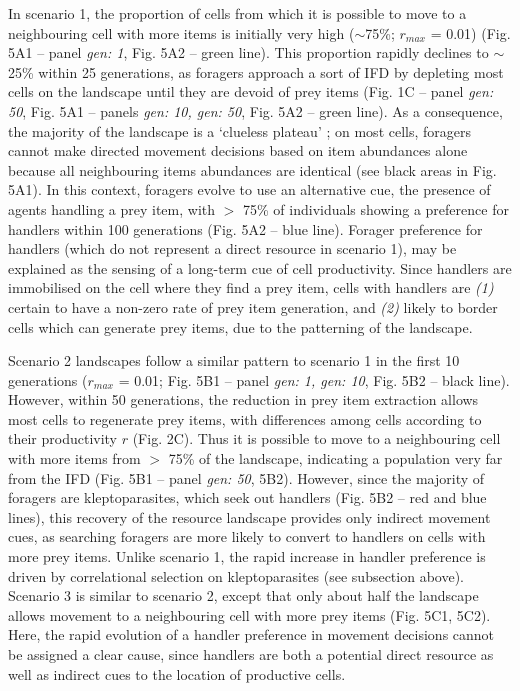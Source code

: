 \documentclass[11pt]{article}
\begin{document}
In scenario 1, the proportion of cells from which it is possible to move to a neighbouring cell with more items is initially very high ($\sim$75\%; $r_{max}$ = 0.01) (Fig. 5A1 -- panel \textit{gen: 1}, Fig. 5A2 -- green line).
This proportion rapidly declines to $\sim$25\% within 25 generations, as foragers approach a sort of IFD by depleting most cells on the landscape until they are devoid of prey items (Fig. 1C -- panel \textit{gen: 50}, Fig. 5A1 -- panels \textit{gen: 10, gen: 50}, Fig. 5A2 -- green line).
As a consequence, the majority of the landscape is a `clueless plateau' \citep{perkins1992}; on most cells, foragers cannot make directed movement decisions based on item abundances alone because all neighbouring items abundances are identical (see black areas in Fig. 5A1).
In this context, foragers evolve to use an alternative cue, the presence of agents handling a prey item, with $>$ 75\% of individuals showing a preference for handlers within 100 generations (Fig. 5A2 -- blue line).
Forager preference for handlers (which do not represent a direct resource in scenario 1), may be explained as the sensing of a long-term cue of cell productivity. 
Since handlers are immobilised on the cell where they find a prey item, cells with handlers are \textit{(1)} certain to have a non-zero rate of prey item generation, and \textit{(2)} likely to border cells which can generate prey items, due to the patterning of the landscape.

Scenario 2 landscapes follow a similar pattern to scenario 1 in the first 10 generations ($r_{max}$ = 0.01; Fig. 5B1 -- panel \textit{gen: 1, gen: 10}, Fig. 5B2 -- black line).
However, within 50 generations, the reduction in prey item extraction allows most cells to regenerate prey items, with differences among cells according to their productivity $r$ (Fig. 2C).
Thus it is possible to move to a neighbouring cell with more items from $>$ 75\% of the landscape, indicating a population very far from the IFD (Fig. 5B1 -- panel \textit{gen: 50}, 5B2).
However, since the majority of foragers are kleptoparasites, which seek out handlers (Fig. 5B2 -- red and blue lines), this recovery of the resource landscape provides only indirect movement cues, as searching foragers are more likely to convert to handlers on cells with more prey items.
Unlike scenario 1, the rapid increase in handler preference is driven by correlational selection on kleptoparasites (see subsection above).
Scenario 3 is similar to scenario 2, except that only about half the landscape allows movement to a neighbouring cell with more prey items (Fig. 5C1, 5C2).
Here, the rapid evolution of a handler preference in movement decisions cannot be assigned a clear cause, since handlers are both a potential direct resource as well as indirect cues to the location of productive cells.
\end{document}
